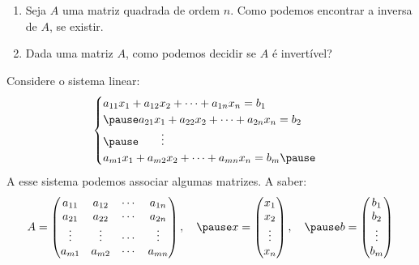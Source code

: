 \documentclass{beamer}
\begin{document}
    \begin{frame}
        \begin{enumerate}[label={\arabic*})]
            \item Seja $A$ uma matriz quadrada de ordem $n$. \pause Como podemos encontrar a inversa de $A$, \pause se existir.\pause

            \vspace{1cm}

            \item Dada uma matriz $A$, \pause como podemos decidir se $A$ é invertível?
        \end{enumerate}
    \end{frame}

    \begin{frame}
        Considere o sistema linear: \pause
        \begin{equation}
            \begin{cases}
                a_{11}x_1 + a_{12}x_2 + \cdots + a_{1n}x_n = b_1\\\pause
                a_{21}x_1 + a_{22}x_2 + \cdots + a_{2n}x_n = b_2\\\pause
                \qquad \vdots\\
                a_{m1}x_1 + a_{m2}x_2 + \cdots + a_{mn}x_n = b_m\pause
            \end{cases}
        \end{equation}
        A esse sistema podemos associar algumas matrizes. \pause A saber:
        \[
            A = \begin{pmatrix}
                a_{11} & a_{12} & \cdots & a_{1n}\\
                a_{21} & a_{22} & \cdots & a_{2n}\\
                \vdots & \vdots & \cdots & \vdots\\
                a_{m1} & a_{m2} & \cdots & a_{mn}
            \end{pmatrix}, \quad\pause
            x = \begin{pmatrix}
                x_1\\
                x_2\\
                \vdots\\
                x_n
            \end{pmatrix},\quad \pause
            b = \begin{pmatrix}
                b_1\\
                b_2\\
                \vdots\\
                b_m
            \end{pmatrix}
        \]
    \end{frame}
\end{document}
